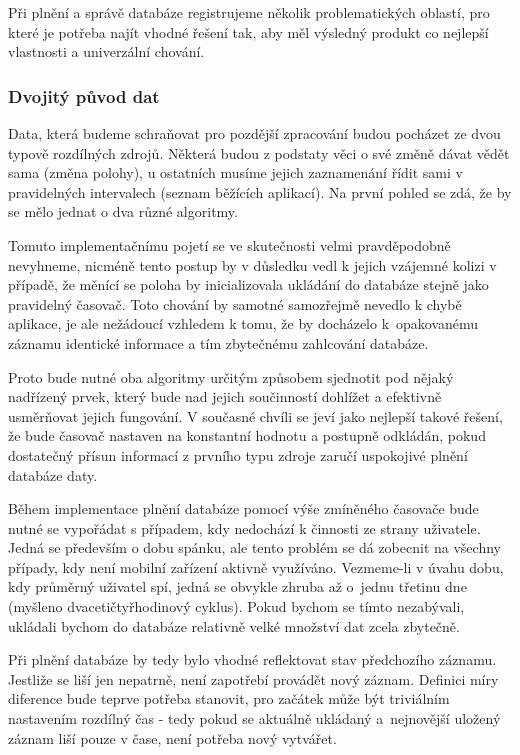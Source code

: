 \documentclass[thesis=M,czech]{FITthesis}[2012/06/26]
\begin{document}
Při plnění a správě databáze registrujeme několik problematických oblastí, pro které je potřeba najít vhodné řešení tak, aby měl výsledný produkt co nejlepší vlastnosti a univerzální chování.

\subsubsection*{Dvojitý původ dat}
Data, která budeme schraňovat pro pozdější zpracování budou pocházet ze dvou typově rozdílných zdrojů. Některá budou z podstaty věci o své změně dávat vědět sama (změna polohy), u ostatních musíme jejich zaznamenání řídit sami v pravidelných intervalech (seznam běžících aplikací). Na první pohled se zdá, že by se mělo jednat o dva různé algoritmy.

Tomuto implementačnímu pojetí se ve skutečnosti velmi pravděpodobně nevyhneme, nicméně tento postup by v důsledku vedl k jejich vzájemné kolizi v případě, že měnící se poloha by inicializovala ukládání do databáze stejně jako pravidelný časovač. Toto chování by samotné samozřejmě nevedlo k chybě aplikace, je ale nežádoucí vzhledem k tomu, že by docházelo k~opakovanému záznamu identické informace a tím zbytečnému zahlcování databáze.

Proto bude nutné oba algoritmy určitým způsobem sjednotit pod nějaký nadřízený prvek, který bude nad jejich součinností dohlížet a efektivně usměrňovat jejich fungování. V současné chvíli se jeví jako nejlepší takové řešení, že bude časovač nastaven na konstantní hodnotu a postupně odkládán, pokud dostatečný přísun informací z prvního typu zdroje zaručí uspokojivé plnění databáze daty.

Během implementace plnění databáze pomocí výše zmíněného časovače bude nutné se vypořádat s případem, kdy nedochází k činnosti ze strany uživatele. Jedná se především o dobu spánku, ale tento problém se dá zobecnit na všechny případy, kdy není mobilní zařízení aktivně využíváno. Vezmeme-li v úvahu dobu, kdy průměrný uživatel spí, jedná se obvykle zhruba až o~jednu třetinu dne (myšleno dvacetičtyřhodinový cyklus). Pokud bychom se tímto nezabývali, ukládali bychom do databáze relativně velké množství dat zcela zbytečně.

Při plnění databáze by tedy bylo vhodné reflektovat stav předchozího záznamu. Jestliže se liší jen nepatrně, není zapotřebí provádět nový záznam. Definici míry diference bude teprve potřeba stanovit, pro začátek může být triviálním nastavením rozdílný čas - tedy pokud se aktuálně ukládaný a~nejnovější uložený záznam liší pouze v čase, není potřeba nový vytvářet.
\end{document}
